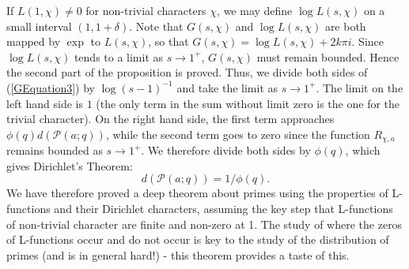 If $L(1, \chi) \neq 0$ for non-trivial characters $\chi$, we may define $\log L(s, \chi)$ on a small interval $(1, 1 + \delta)$. Note that $G(s, \chi)$ and $\log L(s, \chi)$ are both mapped by $\exp$ to $L(s, \chi)$, so that $G(s, \chi) = \log L(s, \chi) + 2k\pi i $. Since $\log L(s, \chi)$ tends to a limit as $s \rightarrow 1^{+}$, $G(s, \chi)$ must remain bounded. Hence the second part of the proposition is proved. Thus, we divide both sides of (\ref{GEquation3}) by $\log (s - 1)^{-1}$ and take the limit as $s \rightarrow 1^{+}$. The limit on the left hand side is $1$ (the only term in the sum without limit zero is the one for the trivial character). On the right hand side, the first term approaches $\phi(q) d\left(\mathcal{P}(a; q)\right)$, while the second term goes to zero since the function $R_{\chi, a}$ remains bounded as $s \rightarrow 1^{+}$. We therefore divide both sides by $\phi(q)$, which gives Dirichlet's Theorem: 
\begin{equation}
    d\left(\mathcal{P}(a; q)\right) = 1/\phi(q). \nonumber
\end{equation}
We have therefore proved a deep theorem about primes using the properties of L-functions and their Dirichlet characters, assuming the key step that L-functions of non-trivial character are finite and non-zero at 1. The study of where the zeros of L-functions occur and do not occur is key to the study of the distribution of primes (and is in general hard!) - this theorem provides a taste of this. \\
